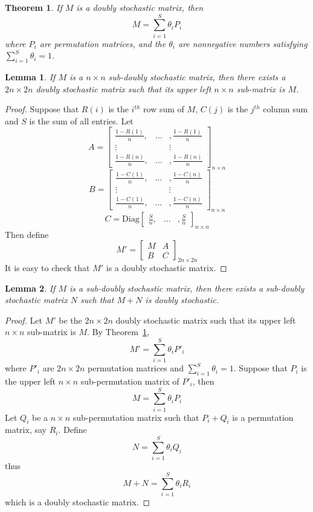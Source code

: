 \documentclass[12pt]{amsart}
\newtheorem{thm}{Theorem}
\newtheorem{lem}{Lemma}
\begin{document}
\begin{thm}
\label{t double stoch}
If $M$ is a doubly stochastic matrix, then
\[ M=\sum_{i=1}^S \theta_iP_i\]
where $P_i$ are permutation matrices, and the $\theta _i$ are
nonnegative numbers satisfying $\sum_{i=1}^S \theta _i =1$.
\end{thm}
\bigskip

\begin{lem}
\label{l 2nx2n}
If $M$ is a $n\times n$ sub-doubly stochastic matrix, 
then there exists a
$2n\times 2n$ doubly stochastic matrix such that its upper left
$n\times n$ sub-matrix is $M$.
\end{lem}

\begin{proof} Suppose that $R(i)$ is the $i^{th}$ row sum of $M$, $C(j)$ is the $j^{th}$ column sum and $S$
is the sum of all entries. Let
\[A=\left[\begin{array}{ccc} \frac{1-R(1)}{n}, & ... & ,\frac{1-R(1)}{n} \\
\vdots & & \vdots \\ \frac{1-R(n)}{n}, & ... &
,\frac{1-R(n)}{n}\end{array}\right]_{n\times n}\]
\[B=\left[\begin{array}{ccc} \frac{1-C(1)}{n}, & ... & ,\frac{1-C(n)}{n} \\
\vdots & & \vdots \\ \frac{1-C(1)}{n}, & ... &
,\frac{1-C(n)}{n}\end{array}\right]_{n\times n}\]
\[C= \mbox{Diag}\left[\begin{array}{ccc} \frac{S}{n}, & ... & ,\frac{S}{n}
\end{array}\right]_{n\times n}\]
Then define
\[M'=\left[\begin{array}{cc} M & A \\
B & C \end{array}\right]_{2n\times 2n}\] It is easy to check that
$M'$ is a doubly stochastic matrix.
\end{proof}

\begin{lem}
\label{l M+N}
If $M$ is a sub-doubly stochastic matrix, then there exists a sub-doubly
stochastic matrix $N$ such that $M+N$ is doubly stochastic.
\end{lem}

\begin{proof}
Let $M'$ be the $2n\times 2n$ doubly stochastic matrix such that
its upper left $n\times n$ sub-matrix is $M$. By Theorem~\ref{t double stoch},
\[ M'=\sum_{i=1}^S \theta_iP'_i\]
where $P'_i$ are $2n\times 2n$ permutation matrices and
$\sum_{i=1}^S \theta _i =1$. Suppose that $P_i$ is the upper left
$n\times n$ sub-permutation matrix of $P'_i$, then
\[ M=\sum_{i=1}^S \theta_iP_i\]
Let $Q_i$ be a $n\times n$ sub-permutation matrix such that
$P_i+Q_i$ is a permutation matrix, say $R_i$. Define
\[N=\sum_{i=1}^S \theta _iQ_i\]
thus \[M+N =\sum_{i=1}^S \theta _i R_i\] which is a doubly
stochastic matrix.
\end{proof}
\end{document}
